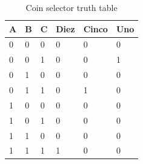 \documentclass{article}
\begin{document}
\begin{multicols}{2}
	\begin{table}[H]
		\centering
		\caption{Coin selector truth table}
		\vspace*{1em}
		\begin{tabular}{|l|l|l|l|l|l|}
			\hline
			A & B & C & Diez & Cinco & Uno \\ \hline
			0 & 0 & 0 & 0    & 0     & 0   \\ \hline
			0 & 0 & 1 & 0    & 0     & 1   \\ \hline
			0 & 1 & 0 & 0    & 0     & 0   \\ \hline
			0 & 1 & 1 & 0    & 1     & 0   \\ \hline
			1 & 0 & 0 & 0    & 0     & 0   \\ \hline
			1 & 0 & 1 & 0    & 0     & 0   \\ \hline
			1 & 1 & 0 & 0    & 0     & 0   \\ \hline
			1 & 1 & 1 & 1    & 0     & 0   \\ \hline
		\end{tabular}
	\end{table}

	
	
\end{multicols}
\end{document}
